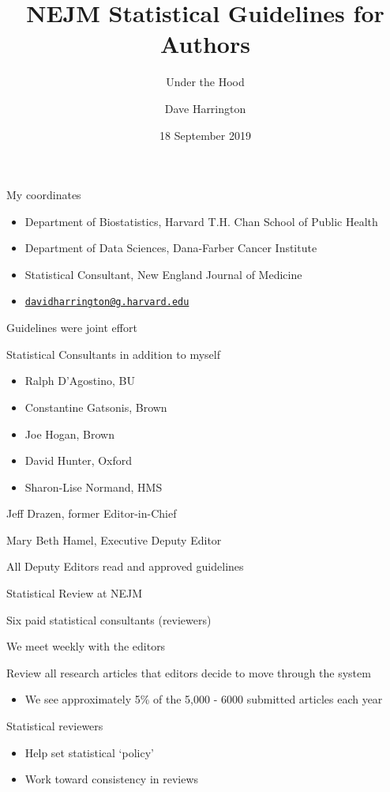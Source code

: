 \documentclass[ignorenonframetext,]{beamer}
\title{NEJM Statistical Guidelines for Authors}
\subtitle{Under the Hood}
\author{Dave Harrington}
\date{18 September 2019}
\providecommand{\tightlist}{%
  \setlength{\itemsep}{0pt}\setlength{\parskip}{0pt}}
\begin{document}
\frame{\titlepage}

\begin{frame}{My coordinates}
\protect\hypertarget{my-coordinates}{}

\begin{itemize}
\item
  Department of Biostatistics, Harvard T.H. Chan School of Public Health
\item
  Department of Data Sciences, Dana-Farber Cancer Institute
\item
  Statistical Consultant, New England Journal of Medicine
\item
  \href{mailto:davidharrington@g.harvard.edu}{\nolinkurl{davidharrington@g.harvard.edu}}
\end{itemize}

\end{frame}

\begin{frame}{Guidelines were joint effort}
\protect\hypertarget{guidelines-were-joint-effort}{}

Statistical Consultants in addition to myself

\begin{itemize}
\tightlist
\item
  Ralph D'Agostino, BU\\
\item
  Constantine Gatsonis, Brown\\
\item
  Joe Hogan, Brown
\item
  David Hunter, Oxford\\
\item
  Sharon-Lise Normand, HMS
\end{itemize}

Jeff Drazen, former Editor-in-Chief

Mary Beth Hamel, Executive Deputy Editor

All Deputy Editors read and approved guidelines

\end{frame}

\begin{frame}{Statistical Review at NEJM}
\protect\hypertarget{statistical-review-at-nejm}{}

Six paid statistical consultants (reviewers)

We meet weekly with the editors

Review all research articles that editors decide to move through the
system

\begin{itemize}
\tightlist
\item
  We see approximately 5\% of the 5,000 - 6000 submitted articles each
  year
\end{itemize}

Statistical reviewers

\begin{itemize}
\item
  Help set statistical `policy'
\item
  Work toward consistency in reviews
\end{itemize}

\end{frame}
\end{document}
